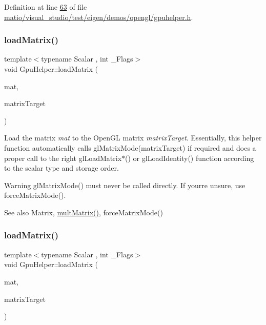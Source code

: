 Definition at line \hyperlink{matio_2visual__studio_2test_2eigen_2demos_2opengl_2gpuhelper_8h_source_l00063}{63} of file \hyperlink{matio_2visual__studio_2test_2eigen_2demos_2opengl_2gpuhelper_8h_source}{matio/visual\+\_\+studio/test/eigen/demos/opengl/gpuhelper.\+h}.

\mbox{\label{class_gpu_helper_a31ac77373dc54409648558d79d5a8c3e}} 
\subsubsection{\texorpdfstring{load\+Matrix()}{loadMatrix()}\hspace{0.1cm}{\footnotesize\ttfamily [1/2]}}
{\footnotesize\ttfamily template$<$typename Scalar , int \+\_\+\+Flags$>$ \\
void Gpu\+Helper\+::load\+Matrix (\begin{DoxyParamCaption}\item[{const \hyperlink{group___core___module_class_eigen_1_1_matrix}{Eigen\+::\+Matrix}$<$ Scalar, 4, 4, \+\_\+\+Flags, 4, 4 $>$ \&}]{mat,  }\item[{G\+Lenum}]{matrix\+Target }\end{DoxyParamCaption})}

Load the matrix {\itshape mat} to the Open\+GL matrix {\itshape matrix\+Target}. Essentially, this helper function automatically calls gl\+Matrix\+Mode(matrix\+Target) if required and does a proper call to the right gl\+Load\+Matrix$\ast$() or gl\+Load\+Identity() function according to the scalar type and storage order. \begin{DoxyWarning}{Warning}
gl\+Matrix\+Mode() must never be called directly. If your\textquotesingle{}re unsure, use force\+Matrix\+Mode(). 
\end{DoxyWarning}
\begin{DoxySeeAlso}{See also}
Matrix, \hyperlink{class_gpu_helper_a3abb45392e7dcf6450fa94bd345d9096}{mult\+Matrix()}, force\+Matrix\+Mode() 
\end{DoxySeeAlso}
\mbox{\label{class_gpu_helper_a31ac77373dc54409648558d79d5a8c3e}} 
\subsubsection{\texorpdfstring{load\+Matrix()}{loadMatrix()}\hspace{0.1cm}{\footnotesize\ttfamily [2/2]}}
{\footnotesize\ttfamily template$<$typename Scalar , int \+\_\+\+Flags$>$ \\
void Gpu\+Helper\+::load\+Matrix (\begin{DoxyParamCaption}\item[{const \hyperlink{group___core___module_class_eigen_1_1_matrix}{Eigen\+::\+Matrix}$<$ Scalar, 4, 4, \+\_\+\+Flags, 4, 4 $>$ \&}]{mat,  }\item[{G\+Lenum}]{matrix\+Target }\end{DoxyParamCaption})}

